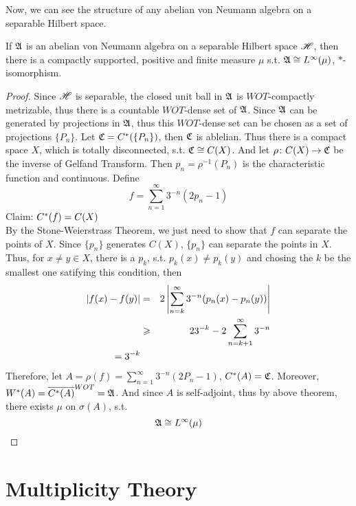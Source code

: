 \documentclass[a4paper,11pt]{report}
\begin{document}
Now, we can see the structure of any abelian von Neumann algebra on a separable Hilbert space.
\begin{thm} \label{thm13}
	If $\mathfrak{A}$ is an abelian von Neumann algebra on a separable Hilbert space $\mathscr{H}$, then there is a compactly supported, positive and finite measure $\mu$ s.t. $\mathfrak{A} \cong L^{\infty}(\mu)$, $*$-isomorphism.
\end{thm}
\begin{proof}
	Since $\mathscr{H}$ is separable, the closed unit ball in $\mathfrak{A}$ is $WOT$-compactly metrizable, thus there is a countable $WOT$-dense set of $\mathfrak{A}$. Since $\mathfrak{A}$ can be generated by projections in $\mathfrak{A}$, thus this $WOT$-dense set can be chosen as a set of projections $\{P_n\}$. Let $\mathfrak{C} = C^{*}(\{P_n\})$, then $\mathfrak{C}$ is ablelian. Thus there is a compact space $X$, which is totally disconnected, s.t. $\mathfrak{C} \cong C(X)$. And let $\rho \colon C(X) \rightarrow \mathfrak{C}$ be the inverse of Gelfand Transform. Then $p_n = \rho^{-1}(P_n)$ is the characteristic function and continuous. Define
	\begin{equation*}
		f = \sum_{n=1}^{\infty} 3^{-n}(2p_n - 1)
	\end{equation*}
	Claim: $C^{*}(f) = C(X)$ \\
	By the Stone-Weierstrass Theorem, we just need to show that $f$ can separate the points of $X$. Since $\{p_n\}$ generates $C(X)$, $\{p_n\}$ can separate the points in $X$. Thus, for $x \neq y \in X$, there is a $p_k$, s.t. $p_k(x) \neq p_k(y)$ and chosing the $k$ be the smallest one satifying this condition, then
	\begin{eqnarray*}
		\left\lvert f(x)-f(y)\right\lvert &=& 2 \left\lvert\sum_{n=k}^{\infty} 3^{-n}(p_n(x) - p_n(y))\right\lvert \\
		&\geqslant& 2 3^{-k} - 2 \sum_{n=k+1}^{\infty} 3^{-n} \\
		= 3^{-k}
	\end{eqnarray*}
	Therefore, let $A = \rho(f) = \sum_{n=1}^{\infty} 3^{-n}(2P_n - 1)$, $C^{*}(A) = \mathfrak{C}$. Moreover, $W^{*}(A) = \overline{C^{*}(A)}^{WOT} = \mathfrak{A}$. And since $A$ is self-adjoint, thus by above theorem, there exists $\mu$ on $\sigma(A)$, s.t.
	\begin{equation*}
		\mathfrak{A} \cong L^{\infty}(\mu) \qedhere
	\end{equation*}
\end{proof}

\section{Multiplicity Theory}
\end{document}
